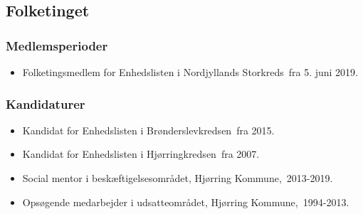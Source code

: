 \documentclass[11pt, a4paper]{awesome-cv}
\begin{document}
\begin{cvletter}
\subsection*{Folketinget}
\subsubsection*{Medlemsperioder}
\begin{itemize}
\item Folketingsmedlem for Enhedslisten i Nordjyllands Storkreds fra 5. juni 2019.
\end{itemize}
\subsubsection*{Kandidaturer}
\begin{itemize}
\item Kandidat for Enhedslisten i Brønderslevkredsen fra 2015.
\item Kandidat for Enhedslisten i Hjørringkredsen fra 2007.
\end{itemize}
\begin{itemize}
\item Social mentor i beskæftigelsesområdet, Hjørring Kommune, 2013-2019.
\item Opsøgende medarbejder i udsatteområdet, Hjørring Kommune, 1994-2013.
\end{itemize}
\end{cvletter}
\end{document}
